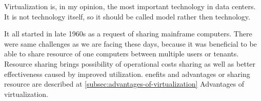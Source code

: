 
Virtualization is, in my opinion, the most important technology in data centers. It is not technology itself, so it should be called model rather then technology. 

It all started in late 1960s as a request of sharing mainframe computers. There were same challenges as we are facing these days, because it was beneficial to be able to share resource of one computers between multiple users or tenants. Resource sharing brings possibility of operational costs sharing as well as better effectiveness caused by improved utilization. enefits and advantages or sharing resource are described at \ref{subsec:advantages-of-virtualization} Advantages of virtualization.

